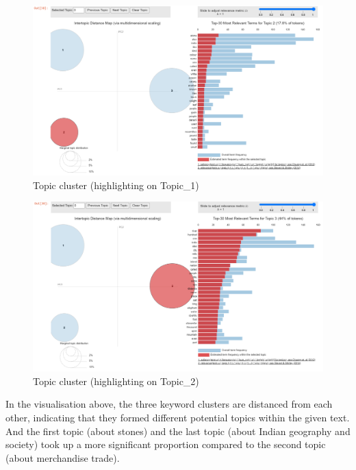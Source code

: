 \documentclass[
  12pt,
]{article}
\begin{document}
\begin{figure}

{\centering \includegraphics{NHthesis_structure_files/figure-pdf/fig-topic_cluster2-output-1.png}

}

\caption{\label{fig-topic_cluster2}Topic cluster (highlighting on
Topic\_1)}

\end{figure}

\begin{figure}

{\centering \includegraphics{NHthesis_structure_files/figure-pdf/fig-topic_cluster3-output-1.png}

}

\caption{\label{fig-topic_cluster3}Topic cluster (highlighting on
Topic\_2)}

\end{figure}

In the visualisation above, the three keyword clusters are distanced
from each other, indicating that they formed different potential topics
within the given text. And the first topic (about stones) and the last
topic (about Indian geography and society) took up a more significant
proportion compared to the second topic (about merchandise trade).
\end{document}
